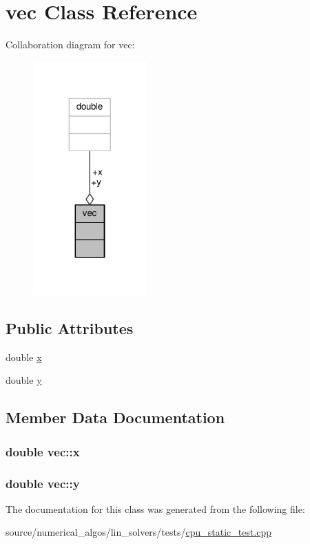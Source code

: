 \hypertarget{classvec}{\section{vec Class Reference}
\label{classvec}
}


Collaboration diagram for vec\-:\nopagebreak
\begin{figure}[H]
\begin{center}
\leavevmode
\includegraphics[width=124pt]{classvec__coll__graph}
\end{center}
\end{figure}
\subsection*{Public Attributes}
\begin{DoxyCompactItemize}
\item 
double \hyperlink{classvec_a16a7eee63e3b1d82978695a7064a7fc6}{x}
\item 
double \hyperlink{classvec_ad7effb515272b2f1010b88a97c90a8c2}{y}
\end{DoxyCompactItemize}


\subsection{Member Data Documentation}
\hypertarget{classvec_a16a7eee63e3b1d82978695a7064a7fc6}{
\subsubsection[{x}]{\setlength{\rightskip}{0pt plus 5cm}double vec\-::x}}\label{classvec_a16a7eee63e3b1d82978695a7064a7fc6}
\hypertarget{classvec_ad7effb515272b2f1010b88a97c90a8c2}{
\subsubsection[{y}]{\setlength{\rightskip}{0pt plus 5cm}double vec\-::y}}\label{classvec_ad7effb515272b2f1010b88a97c90a8c2}


The documentation for this class was generated from the following file\-:\begin{DoxyCompactItemize}
\item 
source/numerical\-\_\-algos/lin\-\_\-solvers/tests/\hyperlink{cpu__static__test_8cpp}{cpu\-\_\-static\-\_\-test.\-cpp}\end{DoxyCompactItemize}
